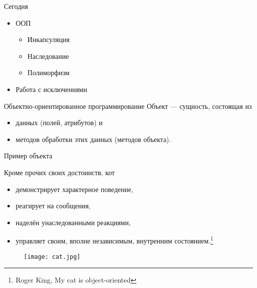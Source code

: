 \documentclass[hyperref={pdftex,unicode}]{beamer}
\begin{document}
\begin{frame}
  \maketitle
\end{frame}

\begin{frame}{Сегодня}
  \begin{itemize}
    \item ООП
      \begin{itemize}
      \item Инкапсуляция
      \item Наследование
      \item Полиморфизм
      \end{itemize}
    \item Работа с исключениями
  \end{itemize}
\end{frame}

\begin{frame}{Объектно-ориентированное программирование}
  Объект --- сущность, состоящая из \\
  \begin{itemize}
  \item данных (полей, атрибутов) и 
  \item методов обработки этих данных (методов объекта).
  \end{itemize}
\end{frame}

\begin{frame}{Пример объекта}
  \begin{minipage}{0.6\linewidth}
  Кроме прочих своих достоинств, кот
  \begin{itemize}
    \item демонстрирует характерное поведение,
    \item реагирует на сообщения,
    \item наделён унаследованными реакциями,
    \item управляет своим, вполне независимым, внутренним состоянием.\footnote[frame]{
   Roger King, My cat is object-oriented}
 \end{itemize}
\end{minipage}
\hfill
\begin{minipage}{0.3\linewidth}
 \begin{figure}[h!]
   \texttt{[image: cat.jpg]}
 \end{figure}
\end{minipage}
\end{frame}
\end{document}
